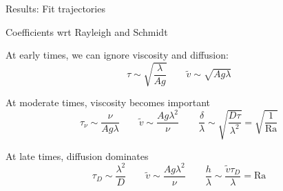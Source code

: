 \documentclass[12pt]{beamer}
\begin{document}
\begin{frame}[t]{Results: Fit trajectories}
\begin{center}
\end{center}
\end{frame}

\begin{frame}[t]{Coefficients wrt Rayleigh and Schmidt}

At early times, we can ignore viscosity and diffusion:
\begin{equation*}
\tau \sim \sqrt{\frac{\lambda}{A g}} \qquad \tilde{v} \sim \sqrt{A g \lambda}
\end{equation*}

At moderate times, viscosity becomes important
\begin{equation*}
\tau_\nu \sim \frac{\nu}{A g \lambda} \qquad \tilde{v} \sim \frac{A g \lambda^2}{\nu} \qquad \frac{\delta}{\lambda} \sim \sqrt{\frac{D \tau}{\lambda^2}} = \sqrt{\frac{1}{\text{Ra}}}
\end{equation*}

At late times, diffusion dominates
\begin{equation*}
\tau_D \sim \frac{\lambda^2}{D} \qquad \tilde{v} \sim \frac{A g \lambda^2}{\nu} \qquad \frac{h}{\lambda} \sim \frac{\tilde{v} \tau_D}{\lambda} = \text{Ra}
\end{equation*}
\end{frame}
\end{document}
